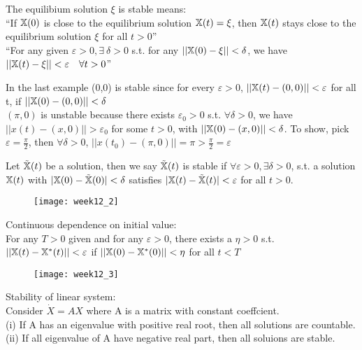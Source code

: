 The equilibium solution $\xi$ is stable means:\\
``If $\mathbb{X}(0)$ is close to the equilibrium solution $\mathbb{X}(t)=\xi$, then $\mathbb{X}(t)$ stays close to the equilibrium solution $\xi$ for all $t>0$''\\
``For any given $\varepsilon>0, \exists~\delta>0$ s.t. for any $||\mathbb{X}(0)-\xi||<\delta$, we have $||\mathbb{X}(t)-\xi||<\varepsilon\quad\forall t>0$''
\begin{example}
In the last example (0,0) is stable since for every $\varepsilon>0$, $||\mathbb{X}(t)-(0,0)||<\varepsilon$ for all t, if $||\mathbb{X}(0)-(0,0)||<\delta$\\
$(\pi,0)$ is unstable because there exists $\varepsilon_0>0$ s.t. $\forall\delta>0$, we have $||x(t)-(x,0)||>\varepsilon_0$ for some $t>0$, with $||\mathbb{X}(0)-(x,0)||<\delta$. To show, pick $\varepsilon=\frac{\pi}{2}$, then $\forall\delta>0$, $||x(t_0)-(\pi,0)||=\pi>\frac{\pi}{2}=\varepsilon$

\end{example}
Let $\tilde{\mathbb{X}}(t)$ be a solution, then we say $\tilde{\mathbb{X}}(t)$ is stable if $\forall\varepsilon>0, \exists\delta>0$, s.t. a solution $\mathbb{X}(t)$ with $|\mathbb{X}(0)-\tilde{\mathbb{X}}(0)|<\delta$ satisfies $|\mathbb{X}(t)-\tilde{\mathbb{X}}(t)|<\varepsilon$ for all $t>0$.
\begin{figure}[H]
\texttt{[image: week12\_2]}
\end{figure}
Continuous dependence on initial value:\\
For any $T>0$ given and for any $\varepsilon>0$, there exists a $\eta>0$ s.t. $||\mathbb{X}(t)-\mathbb{X}^*(t)||<\varepsilon$ if $||\mathbb{X}(0)-\mathbb{X}^*(0)||<\eta$ for all $t<T$
\begin{figure}[H]
\texttt{[image: week12\_3]}
\end{figure}



Stability of linear system:\\
Consider   $ \dot{X}=AX$  where A is a matrix with constant coeffcient. \\

(i) If A has an eigenvalue with positive real root, then all solutions are countable. \\

(ii) If all eigenvalue of A have negative real part, then all soluions are stable. \\

